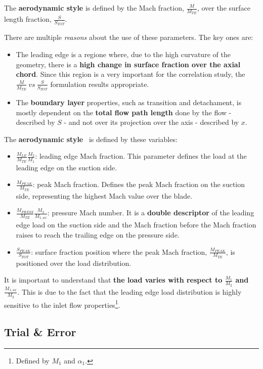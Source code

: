 The \textbf{aerodynamic style} is defined by the Mach fraction, $\frac{M}{M_{TE}}$, over the surface length fraction, $\frac{S}{S_{TOT}}$. 

There are multiple \textit{reasons} about the use of these parameters. The key ones are:

\begin{itemize}
  \item The leading edge is a regione where, due to the high curvature of the geometry, there is a \textbf{high change in surface fraction over the axial chord}. Since this region is a very important for the correlation study, the $\frac{M}{M_{TE}} \ vs \ \frac{S}{S_{TOT}}$ formulation results appropriate.
  \item The \textbf{boundary layer} properties, such as transition and detachament, is mostly dependent on the \textbf{total flow path length} done by the flow - described by $S$ - and not over its projection over the axis - described by $x$.
\end{itemize}

The \textbf{aerodynamic style}~\cite{clark2019step} is defined by these variables:

\begin{itemize}
  \item $\frac{M_{LE}}{M_{TE}} \frac{M_2}{M_1}$: leading edge Mach fraction. This parameter defines the load at the leading edge on the suction side.
  \item $\frac{M_{PEAK}}{M_{TE}}$: peak Mach fraction. Defines the peak Mach fraction on the suction side, representing the highest Mach value over the blade.
  \item $\frac{M_{PRESS}}{M_{TE}} \frac{M_2}{M_{1, ax}}$: pressure Mach number. It is a \textbf{double descriptor} of the leading edge load on the suction side and the Mach fraction before the Mach fraction raises to reach the trailing edge on the pressure side. 
  \item $\frac{S_{PEAK}}{S_{TOT}}$: surface fraction position where the peak Mach fraction, $\frac{M_{PEAK}}{M_{TE}}$, is positioned over the load distribution.
\end{itemize}

It is important to understand that \textbf{the load varies with respect to $\frac{M_1}{M_2}$ and $\frac{M_{1, ax}}{M_2}$}. This
is due to the fact that the leading edge load distribution is highly sensitive to the inlet flow properties\footnote{Defined by $M_1$ and $\alpha_1$.}. 

\subsection{Trial \& Error}

